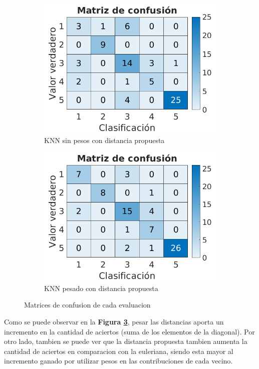 \documentclass[a4paper]{article}
\newcommand{\reffig}[1]{\textbf{Figura \ref{#1}}}
\begin{document}
\begin{figure}[h]
\begin{subfigure}{.4\textwidth}
    \includegraphics[width=\linewidth]{img/cm-weul.png}
    \caption{KNN sin pesos con distancia propuesta}
    \label{sent-cm:sfig3}
  \end{subfigure}
  \begin{subfigure}{.4\textwidth}
    \centering
    \includegraphics[width=\linewidth]{img/cm-wcust.png}
    \caption{KNN pesado con distancia propuesta}
    \label{sent-cm:sfig4}
  \end{subfigure}
  \caption{Matrices de confusion de cada evaluacion}
  \label{sent-cm:fig}
\end{figure}

Como se puede observar en la \reffig{sent-cm:fig}, pesar las distancias aporta un incremento en la cantidad de aciertos (suma de los elementos de la diagonal). Por otro lado, tambien se puede ver que la distancia propuesta tambien aumenta la cantidad de aciertos en comparacion con la euleriana, siendo esta mayor al incremento ganado por utilizar pesos en las contribuciones de cada vecino.
\end{document}
